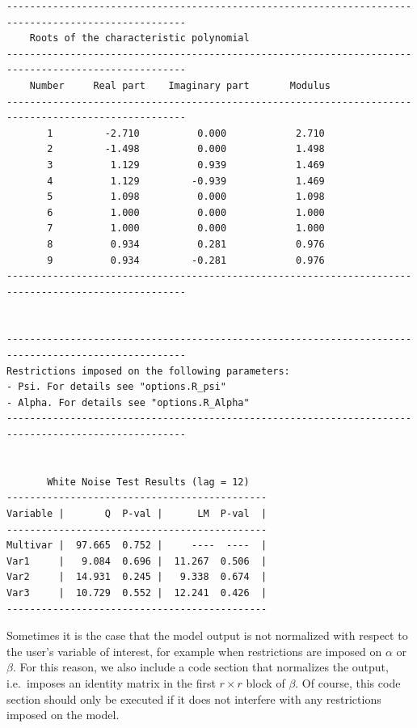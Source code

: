\documentclass[10pt]{article}
\begin{document}
\begin{verbatim}
-----------------------------------------------------------------------------------------------------
    Roots of the characteristic polynomial                                                           
-----------------------------------------------------------------------------------------------------
    Number     Real part    Imaginary part       Modulus                                             
-----------------------------------------------------------------------------------------------------
       1         -2.710          0.000            2.710                                        
       2         -1.498          0.000            1.498                                        
       3          1.129          0.939            1.469                                        
       4          1.129         -0.939            1.469                                        
       5          1.098          0.000            1.098                                        
       6          1.000          0.000            1.000                                        
       7          1.000          0.000            1.000                                        
       8          0.934          0.281            0.976                                        
       9          0.934         -0.281            0.976                                        
-----------------------------------------------------------------------------------------------------


-----------------------------------------------------------------------------------------------------
Restrictions imposed on the following parameters:
- Psi. For details see "options.R_psi"
- Alpha. For details see "options.R_Alpha"
-----------------------------------------------------------------------------------------------------


       White Noise Test Results (lag = 12)
---------------------------------------------
Variable |       Q  P-val |      LM  P-val  |
---------------------------------------------
Multivar |  97.665  0.752 |     ----  ----  |
Var1     |   9.084  0.696 |  11.267  0.506  |
Var2     |  14.931  0.245 |   9.338  0.674  |
Var3     |  10.729  0.552 |  12.241  0.426  |
---------------------------------------------
\end{verbatim}

Sometimes it is the case that the model output is not normalized with respect to the user's variable of interest, for example when restrictions are imposed on $\alpha$ or $\beta$. For this reason, we also include a code section that normalizes the output, i.e.\ imposes an identity matrix in the first $r \times r$ block of $\beta$. Of course, this code section should only be executed if it does not interfere with any restrictions imposed on the model.
\end{document}
